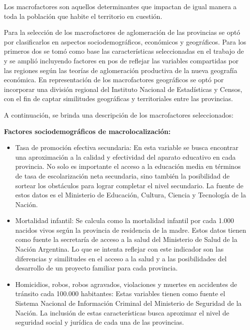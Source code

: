 \documentclass[12pt,a4paper]{article}
\begin{document}
Los macrofactores son aquellos determinantes que impactan de igual manera a toda la población que habite el territorio en cuestión.

Para la selección de los macrofactores de aglomeración de las provincias se optó por clasificarlos en aspectos sociodemográficos, económicos y geográficos. Para los primeros dos se tomó como base las características seleccionadas en el trabajo de \textcite{cicowiez_caracterizacion_2003} y se amplió incluyendo factores en pos de reflejar las variables compartidas por las regiones según las teorías de aglomeración productiva de la nueva geografía económica. En representación de los macrofactores geográficos se optó por incorporar una división regional del Instituto Nacional de Estadísticas y Censos, con el fin de captar similitudes geográficas y territoriales entre las provincias.

A continuación, se brinda una descripción de los macrofactores seleccionados:

\textbf{Factores sociodemográficos de macrolocalización:}
\begin{itemize}

\item Tasa de promoción efectiva secundaria: En esta variable se busca encontrar una aproximación a la calidad y efectividad del aparato educativo en cada provincia. No solo es importante el acceso a la educación media en términos de tasa de escolarización neta secundaria, sino también la posibilidad de sortear los obstáculos para lograr completar el nivel secundario. La fuente de estos datos es el Ministerio de Educación, Cultura, Ciencia y Tecnología de la Nación.

\item Mortalidad infantil: Se calcula como la mortalidad infantil por cada 1.000 nacidos vivos según la provincia de residencia de la madre. Estos datos tienen como fuente la secretaría de acceso a la salud del Ministerio de Salud de la Nación Argentina. Lo que se intenta reflejar con este indicador son las diferencias y similitudes en el acceso a la salud y a las posibilidades del desarrollo de un proyecto familiar para cada provincia.

\item Homicidios, robos, robos agravados, violaciones y muertes en accidentes de tránsito cada 100.000 habitantes: Estas variables tienen como fuente el Sistema Nacional de Información Criminal del Ministerio de Seguridad de la Nación. La inclusión de estas características busca aproximar el nivel de seguridad social y jurídica de cada una de las provincias. 
\end{itemize}
\end{document}
